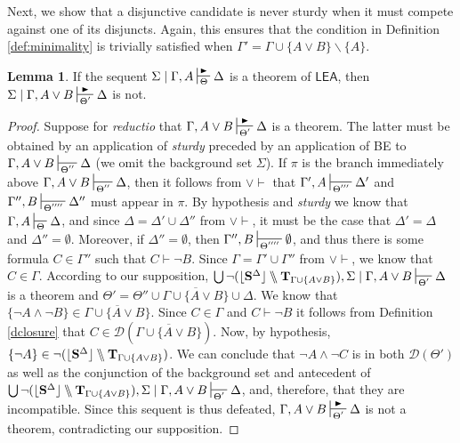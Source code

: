 \documentclass{article}
\theoremstyle{definition}
\theoremstyle{definition}
\theoremstyle{definition}
\newtheorem{lemma}{Lemma}
\theoremstyle{definition}
\theoremstyle{remark}
\theoremstyle{definition}
\theoremstyle{definition}
\begin{document}
Next, we show that a disjunctive candidate is never sturdy when it must compete against one of its disjuncts. Again, this ensures that the condition in Definition \ref{def:minimality} is trivially satisfied when $ \Gamma' = \Gamma\cup\{A\vee B\}\backslash\{A\}$.

\begin{lemma}\label{lem:disjmin1}
	If the sequent $ \Sigma\mid \Gamma, A \sststile{\Theta}{\RHD} \Delta $ is a theorem of $ \mathsf{LEA}$, then $ \Sigma\mid \Gamma, A\vee B \sststile{\Theta'}{\RHD} \Delta $ is not.
	
	\begin{proof}
		Suppose for \textit{reductio} that $ \Gamma, A\vee B \sststile{\Theta'}{\RHD} \Delta $ is a theorem. The latter must be obtained by an application of \textit{sturdy} preceded by an application of \textsf{BE} to $ \Gamma, A\vee B \sststile{\Theta''}{} \Delta  $ (we omit the background set $ \Sigma $). If $ \pi $ is the branch immediately above $ \Gamma, A\vee B \sststile{\Theta''}{} \Delta  $, then it follows from $ \vee\vdash $ that $ \Gamma', A\sststile{\Theta'''}{} \Delta'  $ and $ \Gamma'', B\sststile{\Theta''''}{} \Delta''  $ must appear in $ \pi $. By hypothesis and \textit{sturdy} we know that $ \Gamma, A \sststile{\Theta}{} \Delta$, and since  $ \Delta =\Delta'\cup\Delta'' $ from $ \vee\vdash $, it must be the case that  $ \Delta'=\Delta $ and $ \Delta''=\emptyset $. Moreover, if $ \Delta''=\emptyset $, then $ \Gamma'', B\sststile{\Theta''''}{}  \emptyset$, and thus there is some formula $ C \in \Gamma'' $ such that $ C\vdash \neg B $. Since $ \Gamma=\Gamma'\cup\Gamma'' $ from $ \vee\vdash $, we  know that $ C \in \Gamma$.   According to our supposition, $ \bigcup\neg(\lfloor\mathbf{S}^\Delta\rfloor\bbslash\mathbf{T}_{\Gamma\cup\{A\vee B\}}), \Sigma\mid\Gamma, A\vee B \sststile{\Theta'}{} \Delta $ is a theorem and $ \Theta' = \Theta''\cup\overline{\Gamma\cup\{A\vee B\}}  \cup\Delta $. We know that $ \{\neg A \wedge \neg B\} \in  \overline{\Gamma\cup\{A\vee B\}} $. Since $ C \in \Gamma $ and $ C \vdash \neg B $ it follows from Definition \ref{dclosure} that $ C \in \mathcal{D}(\overline{\Gamma\cup\{A\vee B\}}) $. Now, by hypothesis, $ \{\neg A\}\in\neg (\lfloor\mathbf{S}^\Delta\rfloor\bbslash\mathbf{T}_{\Gamma\cup\{A\vee B\}}) $. We can  conclude that $ \neg A \wedge \neg C $ is in both $ \mathcal{D}(\Theta') $ as well as the conjunction of the background set and antecedent of $ \bigcup\neg(\lfloor\mathbf{S}^\Delta\rfloor\bbslash\mathbf{T}_{\Gamma\cup\{A\vee B\}}), \Sigma\mid\Gamma, A\vee B \sststile{\Theta'}{} \Delta $, and, therefore, that they are incompatible. Since this sequent is thus defeated, $ \Gamma, A\vee B \sststile{\Theta'}{\RHD} \Delta $ is not a theorem, contradicting our supposition.
	\end{proof}
\end{lemma}
\end{document}
